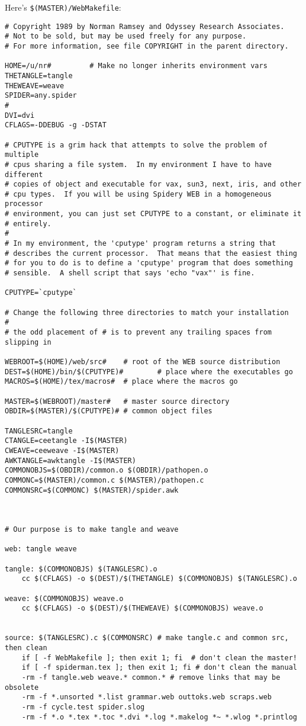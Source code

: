 Here's \verb+$(MASTER)/WebMakefile+:
\begingroup\small
\begin{verbatim}
# Copyright 1989 by Norman Ramsey and Odyssey Research Associates.
# Not to be sold, but may be used freely for any purpose.
# For more information, see file COPYRIGHT in the parent directory.

HOME=/u/nr#			# Make no longer inherits environment vars
THETANGLE=tangle
THEWEAVE=weave
SPIDER=any.spider
#
DVI=dvi
CFLAGS=-DDEBUG -g -DSTAT

# CPUTYPE is a grim hack that attempts to solve the problem of multiple
# cpus sharing a file system.  In my environment I have to have different
# copies of object and executable for vax, sun3, next, iris, and other 
# cpu types.  If you will be using Spidery WEB in a homogeneous processor
# environment, you can just set CPUTYPE to a constant, or eliminate it 
# entirely.  
#
# In my environment, the 'cputype' program returns a string that
# describes the current processor.  That means that the easiest thing
# for you to do is to define a 'cputype' program that does something
# sensible.  A shell script that says 'echo "vax"' is fine.

CPUTYPE=`cputype`

# Change the following three directories to match your installation
#
# the odd placement of # is to prevent any trailing spaces from slipping in

WEBROOT=$(HOME)/web/src# 	# root of the WEB source distribution
DEST=$(HOME)/bin/$(CPUTYPE)#	 	# place where the executables go
MACROS=$(HOME)/tex/macros# 	# place where the macros go

MASTER=$(WEBROOT)/master# 	# master source directory
OBDIR=$(MASTER)/$(CPUTYPE)#	# common object files

TANGLESRC=tangle
CTANGLE=ceetangle -I$(MASTER)
CWEAVE=ceeweave -I$(MASTER)
AWKTANGLE=awktangle -I$(MASTER)
COMMONOBJS=$(OBDIR)/common.o $(OBDIR)/pathopen.o
COMMONC=$(MASTER)/common.c $(MASTER)/pathopen.c
COMMONSRC=$(COMMONC) $(MASTER)/spider.awk



# Our purpose is to make tangle and weave

web: tangle weave

tangle: $(COMMONOBJS) $(TANGLESRC).o
	cc $(CFLAGS) -o $(DEST)/$(THETANGLE) $(COMMONOBJS) $(TANGLESRC).o

weave: $(COMMONOBJS) weave.o
	cc $(CFLAGS) -o $(DEST)/$(THEWEAVE) $(COMMONOBJS) weave.o


source: $(TANGLESRC).c $(COMMONSRC) # make tangle.c and common src, then clean
	if [ -f WebMakefile ]; then exit 1; fi  # don't clean the master!
	if [ -f spiderman.tex ]; then exit 1; fi # don't clean the manual
	-rm -f tangle.web weave.* common.* # remove links that may be obsolete
	-rm -f *.unsorted *.list grammar.web outtoks.web scraps.web 
	-rm -f cycle.test spider.slog
	-rm -f *.o *.tex *.toc *.dvi *.log *.makelog *~ *.wlog *.printlog


\end{verbatim}
